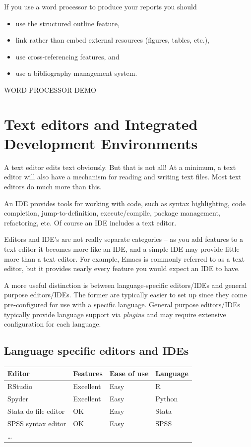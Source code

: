 \documentclass[]{book}
\providecommand{\tightlist}{%
  \setlength{\itemsep}{0pt}\setlength{\parskip}{0pt}}
\begin{document}
If you use a word processor to produce your reports you should

\begin{itemize}
\tightlist
\item
  use the structured outline feature,
\item
  link rather than embed external resources (figures, tables, etc.),
\item
  use cross-referencing features, and
\item
  use a bibliography management system.
\end{itemize}

WORD PROCESSOR DEMO

\section{Text editors and Integrated Development
Environments}\label{text-editors-and-integrated-development-environments}

A text editor edits text obviously. But that is not all! At a minimum, a
text editor will also have a mechanism for reading and writing text
files. Most text editors do much more than this.

An IDE provides tools for working with code, such as syntax
highlighting, code completion, jump-to-definition, execute/compile,
package management, refactoring, etc. Of course an IDE includes a text
editor.

Editors and IDE's are not really separate categories -- as you add
features to a text editor it becomes more like an IDE, and a simple IDE
may provide little more than a text editor. For example, Emacs is
commonly referred to as a text editor, but it provides nearly every
feature you would expect an IDE to have.

A more useful distinction is between language-specific editors/IDEs and
general purpose editors/IDEs. The former are typically easier to set up
since they come pre-configured for use with a specific language. General
purpose editors/IDEs typically provide language support via
\emph{plugins} and may require extensive configuration for each
language.

\subsection{Language specific editors and
IDEs}\label{language-specific-editors-and-ides}

\begin{longtable}[]{@{}llll@{}}
\toprule
Editor & Features & Ease of use & Language\tabularnewline
\midrule
\endhead
RStudio & Excellent & Easy & R\tabularnewline
Spyder & Excellent & Easy & Python\tabularnewline
Stata do file editor & OK & Easy & Stata\tabularnewline
SPSS syntax editor & OK & Easy & SPSS\tabularnewline
\ldots{} & & &\tabularnewline
\bottomrule
\end{longtable}
\end{document}
